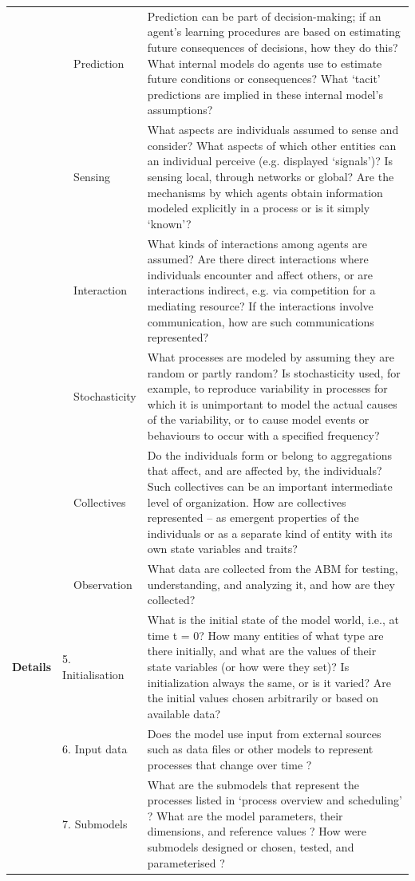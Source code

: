 \begin{table}[H]
{\begin{tabular}{|p{1.05cm}|p{1.15cm}|p{1.25cm}|p{10cm}|}
		&  & Prediction & Prediction can be part of decision-making; if an agent’s learning procedures are based on estimating future consequences of decisions, how they do this? What internal models do agents use to estimate future conditions or consequences? What ‘tacit’ predictions are implied in these internal model’s assumptions? \\ \cline{3-4} 
		&  & Sensing & What aspects are individuals assumed to sense and consider? What aspects of which other entities can an individual perceive (e.g. displayed ‘signals’)? Is sensing local, through networks or global? Are the mechanisms by which agents obtain information modeled explicitly in a process or is it simply ‘known’? \\ \cline{3-4} 
		&  & Interaction & What kinds of interactions among agents are assumed? Are there direct interactions where individuals encounter and affect others, or are interactions indirect, e.g. via competition for a mediating resource? If the interactions involve communication, how are such communications represented? \\ \cline{3-4} 
		&  & Stochasticity & What processes are modeled by assuming they are random or partly random? Is stochasticity used, for example, to reproduce variability in processes for which it is unimportant to model the actual causes of the variability, or to cause model events or behaviours to occur with a specified frequency? \\ \cline{3-4} 
		&  & Collectives & Do the individuals form or belong to aggregations that affect, and are affected by, the individuals? Such collectives can be an important intermediate level of organization. How are collectives represented – as emergent properties of the individuals or as a separate kind of entity with its own state variables and traits? \\ \cline{3-4} 
		&  & Observation & What data are collected from the ABM for testing, understanding, and analyzing it, and how are they collected? \\ \hline
		\textbf{Details} & \multicolumn{2}{l|}{5. Initialisation} & What is the initial state of the model world, i.e., at time t = 0? How many entities of what type are there initially, and what are the values of their state variables (or how were they set)? Is initialization always the same, or is it varied? Are the initial values chosen arbitrarily or based on available data? \\ \hline
		& \multicolumn{2}{l|}{6. Input data} & Does the model use input from external sources such as data files or other models to represent processes that change over time ? \\ \cline{2-4} 
		& \multicolumn{2}{l|}{7. Submodels} & What are the submodels that represent the processes listed in ‘process overview and scheduling’ ? What are the model parameters, their dimensions, and reference values ? How were submodels designed or chosen, tested, and parameterised ? \\ \hline
	\end{tabular}}
\end{table}

